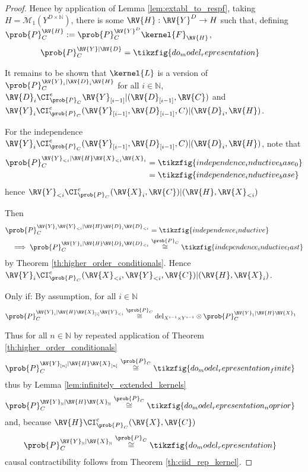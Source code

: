 \begin{proof}
Hence by application of Lemma \ref{lem:extabl_to_respf}, taking $H=\mathcal{M}_1(Y^{D\times\mathbb{N}})$, there is some $\RV{H}:\RV{Y}^D\to H$ such that, defining $\prob{P}^{\RV{H}}_C:=\prob{P}_C^{\RV{Y}^D}\kernel{F}_{\RV{H}}$,
\begin{align}
    \prob{P}_C^{\RV{Y}|\RV{D}} &= \tikzfig{do_model_representation}
\end{align}

It remains to be shown that $\kernel{L}$ is a version of $\prob{P}_C^{\RV{Y}_i|\RV{D}_i\RV{H}}$ for all $i\in \mathbb{N}$, $\RV{D}_i\CI^e_{\prob{P}_C} \RV{Y}_{[i-1]}|(\RV{D}_{[i-1]},\RV{C})$ and $\RV{Y}_i\CI^e_{\prob{P}_C} (\RV{Y}_{[i-1]},\RV{D}_{[i-1]},C)|(\RV{D}_i,\RV{H})$.


For the independence $\RV{Y}_i\CI^e_{\prob{P}_C} (\RV{Y}_{[i-1]},\RV{D}_{[i-1]},C)|(\RV{D}_i,\RV{H})$, note that
\begin{align}
     \prob{P}_C^{\RV{Y}_{<i}|\RV{H}\RV{X}_{<i}\RV{X}_i} &= \tikzfig{independence_inductive_base_0}\\
     &= \tikzfig{independence_inductive_base}
\end{align}
hence $\RV{Y}_{<i}\CI^e_{\prob{P}_C} (\RV{X}_i,\RV{C})|(\RV{H},\RV{X}_{<i})$

Then
\begin{align}
    \prob{P}_C^{\RV{Y}_i\RV{Y}_{<i}|\RV{H}\RV{D}_i\RV{D}_{<i}} &= \tikzfig{independence_inductive}\\
    \implies \prob{P}_C^{\RV{Y}_i|\RV{H}\RV{D}_i\RV{D}_{<i}} &\overset{\prob{P}_C}{\cong} \tikzfig{independence_inductive_last}
\end{align}
by Theorem \ref{th:higher_order_conditionals}. Hence $\RV{Y}_i\CI^e_{\prob{P}_C} (\RV{X}_{<i},\RV{Y}_{<i},\RV{C})|(\RV{H},\RV{X}_i)$.

Only if:
By assumption, for all $i\in \mathbb{N}$
\begin{align}
    \prob{P}_C^{\RV{Y}_i|\RV{H}\RV{X}_{[i]}\RV{Y}_{<i}} &\overset{\prob{P}_C}{\cong} \text{del}_{X^{i-1}\times Y^{i-1}}\otimes \prob{P}_C^{\RV{Y}_1|\RV{H}\RV{X}_1}
\end{align}

Thus for all $n\in \mathbb{N}$ by repeated application of Theorem \ref{th:higher_order_conditionals}
\begin{align}
    \prob{P}_C^{\RV{Y}_{[n]}|\RV{H}\RV{X}_{[n]}} &\overset{\prob{P}_C}{\cong} \tikzfig{do_model_representation_finite}
\end{align}
thus by Lemma \ref{lem:infinitely_extended_kernels}
\begin{align}
    \prob{P}_C^{\RV{Y}_{\mathbb{N}}|\RV{H}\RV{X}_{\mathbb{N}}} &\overset{\prob{P}_C}{\cong} \tikzfig{do_model_representation_noprior}
\end{align}
and, because $\RV{H}\CI_{\prob{P}_C}^e(\RV{X},\RV{C})$
\begin{align}
    \prob{P}_C^{\RV{Y}_{\mathbb{N}}|\RV{X}_{\mathbb{N}}} &\overset{\prob{P}_C}{\cong} \tikzfig{do_model_representation}
\end{align}
causal contractibility follows from Theorem \ref{th:ciid_rep_kernel}.
\end{proof}

